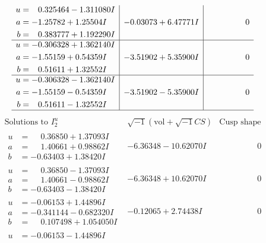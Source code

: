 \documentclass[1p]{elsarticle_modified}
\theoremstyle{definition}
\newcommand{\I}{\sqrt{-1}}
\begin{document}
$$\begin{array}{c|c|c}
\begin{aligned}
u &= \phantom{-}0.325464 - 1.311080 I \\
a &= -1.25782 + 1.25504 I \\
b &= \phantom{-}0.383777 + 1.192290 I\end{aligned}
 & -0.03073 + 6.47771 I & \phantom{-0.000000 } 0 \\ \hline\begin{aligned}
u &= -0.306328 + 1.362140 I \\
a &= -1.55159 + 0.54359 I \\
b &= \phantom{-}0.51611 + 1.32552 I\end{aligned}
 & -3.51902 + 5.35900 I & \phantom{-0.000000 } 0 \\ \hline\begin{aligned}
u &= -0.306328 - 1.362140 I \\
a &= -1.55159 - 0.54359 I \\
b &= \phantom{-}0.51611 - 1.32552 I\end{aligned}
 & -3.51902 - 5.35900 I & \phantom{-0.000000 } 0\\
 \hline 
 \end{array}$$\newpage$$\begin{array}{c|c|c}  
\text{Solutions to }I^u_{2}& \I (\text{vol} + \sqrt{-1}CS) & \text{Cusp shape}\\
 \hline 
\begin{aligned}
u &= \phantom{-}0.36850 + 1.37093 I \\
a &= \phantom{-}1.40661 + 0.98862 I \\
b &= -0.63403 + 1.38420 I\end{aligned}
 & -6.36348 - 10.62070 I & \phantom{-0.000000 } 0 \\ \hline\begin{aligned}
u &= \phantom{-}0.36850 - 1.37093 I \\
a &= \phantom{-}1.40661 - 0.98862 I \\
b &= -0.63403 - 1.38420 I\end{aligned}
 & -6.36348 + 10.62070 I & \phantom{-0.000000 } 0 \\ \hline\begin{aligned}
u &= -0.06153 + 1.44896 I \\
a &= -0.341144 - 0.682320 I \\
b &= \phantom{-}0.107498 + 1.054050 I\end{aligned}
 & -0.12065 + 2.74438 I & \phantom{-0.000000 } 0 \\ \hline\begin{aligned}
u &= -0.06153 - 1.44896 I \\

\end{aligned}
\end{array}$$
\end{document}
